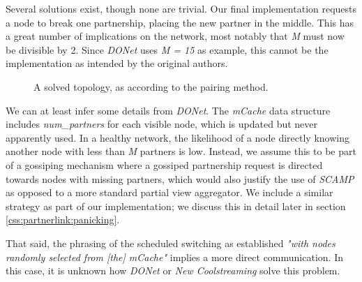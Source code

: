 \documentclass[12pt,a4paper]{article}
\begin{document}
Several solutions exist, though none are trivial. Our final implementation requests a node to break one partnership, placing the new partner in the middle. This has a great number of implications on the network, most notably that \textit{M} must now be divisible by 2. Since \textit{DONet} uses \textit{M = 15} as example, this cannot be the implementation as intended by the original authors.

\begin{figure}[!ht]
	\centering
	\caption{A solved topology, as according to the pairing method.}
	\label{fig2}
\end{figure}

We can at least infer some details from \textit{DONet}. The \textit{mCache} data structure includes \textit{num\_partners} for each visible node, which is updated but never apparently used. In a healthy network, the likelihood of a node directly knowing another node with less than \textit{M} partners is low. Instead, we assume this to be part of a gossiping mechanism where a gossiped partnership request is directed towards nodes with missing partners, which would also justify the use of \textit{SCAMP} as opposed to a more standard partial view aggregator. We include a similar strategy as part of our implementation; we discuss this in detail later in section \ref{css:partnerlink:panicking}.

That said, the phrasing of the scheduled switching as established \textit{"with nodes randomly selected from [the] mCache"} implies a more direct communication. In this case, it is unknown how \textit{DONet} or \textit{New Coolstreaming} solve this problem.
\end{document}
